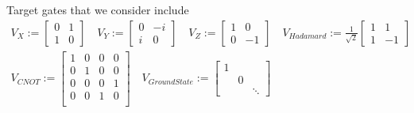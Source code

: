 \documentclass[letterpaper]{article}
\begin{document}
Target gates that we consider include
    \begin{align}
      V_{X} := \begin{bmatrix} 0 & 1 \\ 1 & 0  \end{bmatrix} \quad
      V_{Y} := \begin{bmatrix} 0 & -i \\ i & 0 \end{bmatrix} \quad
      V_{Z} := \begin{bmatrix} 1 & 0 \\ 0 & -1 \end{bmatrix} \quad 
      V_{Hadamard} := \frac{1}{\sqrt{2}} \begin{bmatrix} 1 & 1 \\ 1 & -1 \end{bmatrix} \\
      V_{CNOT} := \begin{bmatrix} 1  & 0 & 0 & 0 \\ 
                                   0  & 1 & 0 & 0 \\ 
                                   0  & 0 & 0 & 1 \\ 
                                   0  & 0 & 1 & 0 \\ 
                    \end{bmatrix}\quad 
      V_{GroundState} := \begin{bmatrix} 1  &   &      \\ 
                                            & 0 &      \\ 
                                            &   &  \ddots 
                    \end{bmatrix}
    \end{align}

\end{document}
